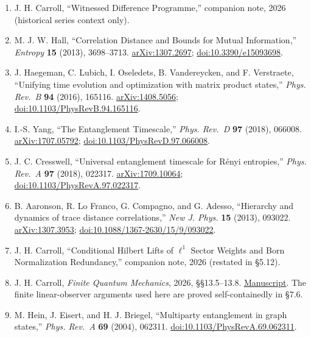 \documentclass[
  11pt,
]{article}
\begin{document}
\begin{enumerate}
\item
  J. H. Carroll, ``Witnessed Difference Programme,'' companion note, 2026 (historical series context only).
\item
  M. J. W. Hall, ``Correlation Distance and Bounds for Mutual Information,'' \emph{Entropy} \textbf{15} (2013), 3698--3713. \href{https://arxiv.org/abs/1307.2697}{arXiv:1307.2697}; \href{https://doi.org/10.3390/e15093698}{doi:10.3390/e15093698}.
\item
  J. Haegeman, C. Lubich, I. Oseledets, B. Vandereycken, and F. Verstraete, ``Unifying time evolution and optimization with matrix product states,'' \emph{Phys. Rev.~B} \textbf{94} (2016), 165116. \href{https://arxiv.org/abs/1408.5056}{arXiv:1408.5056}; \href{https://doi.org/10.1103/PhysRevB.94.165116}{doi:10.1103/PhysRevB.94.165116}.
\item
  I.-S. Yang, ``The Entanglement Timescale,'' \emph{Phys. Rev.~D} \textbf{97} (2018), 066008. \href{https://arxiv.org/abs/1707.05792}{arXiv:1707.05792}; \href{https://doi.org/10.1103/PhysRevD.97.066008}{doi:10.1103/PhysRevD.97.066008}.
\item
  J. C. Cresswell, ``Universal entanglement timescale for Rényi entropies,'' \emph{Phys. Rev.~A} \textbf{97} (2018), 022317. \href{https://arxiv.org/abs/1709.10064}{arXiv:1709.10064}; \href{https://doi.org/10.1103/PhysRevA.97.022317}{doi:10.1103/PhysRevA.97.022317}.
\item
  B. Aaronson, R. Lo Franco, G. Compagno, and G. Adesso, ``Hierarchy and dynamics of trace distance correlations,'' \emph{New J. Phys.} \textbf{15} (2013), 093022. \href{https://arxiv.org/abs/1307.3953}{arXiv:1307.3953}; \href{https://doi.org/10.1088/1367-2630/15/9/093022}{doi:10.1088/1367-2630/15/9/093022}.
\item
  J. H. Carroll, ``Conditional Hilbert Lifts of \(\ell^1\) Sector Weights and Born Normalization Redundancy,'' companion note, 2026 (restated in §5.12).
\item
  J. H. Carroll, \emph{Finite Quantum Mechanics}, 2026, §§13.5--13.8. \href{https://github.com/dbccpage/the_symbol_game/blob/4a4fd192f/omega_engine_atlas/coda_atlas/F004_papers/006_finite_qm/finite_quantum_mechanics.md}{Manuscript}. The finite linear-observer arguments used here are proved self-containedly in §7.6.
\item
  M. Hein, J. Eisert, and H. J. Briegel, ``Multiparty entanglement in graph states,'' \emph{Phys. Rev.~A} \textbf{69} (2004), 062311. \href{https://doi.org/10.1103/PhysRevA.69.062311}{doi:10.1103/PhysRevA.69.062311}.

\end{enumerate}
\end{document}
